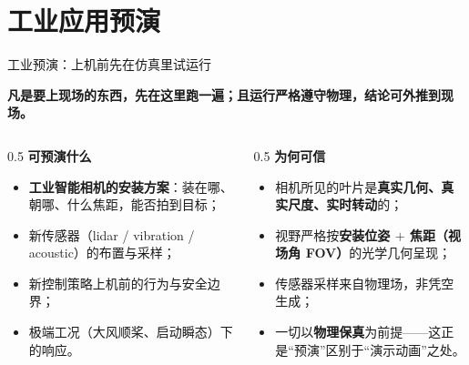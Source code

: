 \documentclass[aspectratio=169,10pt,UTF8]{ctexbeamer}
\newcommand{\hl}[1]{{\color{myblue}\bfseries #1}}
\begin{document}
\section{工业应用预演}

\begin{frame}{工业预演：上机前先在仿真里试运行}
  \begin{center}
    \hl{凡是要上现场的东西，先在这里跑一遍；且运行严格遵守物理，结论可外推到现场。}
  \end{center}
  \vspace{0.4em}
  \begin{columns}[T]
    \begin{column}{0.5\textwidth}
      \textbf{可预演什么}
      \begin{itemize}\small
        \item \hl{工业智能相机的安装方案}：装在哪、朝哪、什么焦距，能否拍到目标；
        \item 新传感器（lidar / vibration / acoustic）的布置与采样；
        \item 新控制策略上机前的行为与安全边界；
        \item 极端工况（大风顺桨、启动瞬态）下的响应。
      \end{itemize}
    \end{column}
    \begin{column}{0.5\textwidth}
      \textbf{为何可信}
      \begin{itemize}\small
        \item 相机所见的叶片是\hl{真实几何、真实尺度、实时转动}的；
        \item 视野严格按\textbf{安装位姿 $+$ 焦距（视场角 FOV）}的光学几何呈现；
        \item 传感器采样来自物理场，非凭空生成；
        \item 一切以\textbf{物理保真}为前提——这正是“预演”区别于“演示动画”之处。
      \end{itemize}
    \end{column}
  \end{columns}
\end{frame}
\end{document}
